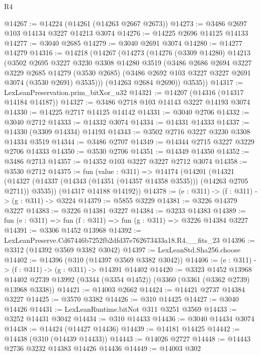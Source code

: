 \begin{lexlean}{R4}
\begin{coremodule}
@14267 := @14224 (@14261 (@14263 @2667 @2673))
@14273 := @3486 @2697 @103 @14134 @3227 @14213 @3074
@14276 := @14225 @2696 @14125 @14133
@14277 := @3040 @2685
@14279 := @3040 @2691 @3074
@14280 := @14277 @14279
@14316 := @14218
    (@14267
      (@14273
        (@14276
          (@3309 @14280)
          @14213
          (@3502
            @2695
            @3227
            @3230
            @3308
            @14280
            @3519
            (@3486
              @2686
              @2694
              @3227
              @3229
              @2685
              @14279
              (@3530 @2685)
              (@3486 @2692 @103 @3227 @3227 @2691 @3074 (@3530 @2691) @3535)))
          (@14263 @2684 @2690))
        @3535))
@14317 := LexLeanPreservation.prim_bitXor_u32
@14321 := @14207 (@14316 (@14317 @14184 @14187))
@14327 := @3486 @2718 @103 @14143 @3227 @14193 @3074
@14330 := @14225 @2717 @14125 @14142
@14331 := @3040 @2706
@14332 := @3040 @2712
@14333 := @14332 @3074
@14334 := @14331 @14333
@14337 := @14330 (@3309 @14334) @14193
@14343 := @3502 @2716 @3227 @3230 @3308 @14334 @3519
@14344 := @3486 @2707
@14349 := @14344 @2715 @3227 @3229 @2706 @14333
@14350 := @3530 @2706
@14351 := @14349 @14350
@14352 := @3486 @2713
@14357 := @14352 @103 @3227 @3227 @2712 @3074
@14358 := @3530 @2712
@14375 := fun (value : @311) =>
  @14174
    (@14201
      (@14321 (@14327 (@14337 (@14343 (@14351 (@14357 @14358 @3535))) (@14263 @2705 @2711)) @3535))
      (@14317 @14188 @14192))
@14378 := (e : @311) -> (f : @311) -> (g : @311) -> @3224
@14379 := @5855 @3229
@14381 := @3226 @14379 @3227
@14383 := @3226 @14381 @3227
@14384 := @3233 @14383
@14389 := fun (e : @311) => fun (f : @311) => fun (g : @311) => @3226 @14384 @3227
@14391 := @3306 @1452 @13968
@14392 := LexLeanPreserve.Cd67446b7252fb2dfd37e762673433a18.R4.__fits_23
@14396 := @3312 (@14392 @3569 @3382 @3042)
@14397 := LexLeanStd.Sha256.choose
@14402 := @14396 (@310 (@14397 @3569 @3382 @3042))
@14406 := (e : @311) -> (f : @311) -> (g : @311) -> @14391 @14402
@14420 := @3323
    @1452
    @13968
    @14402
    @2739
    @13992
    (@3344 (@3354 @1452))
    (@3360 (@3361 (@3362 @2739) @13968 @3338))
@14421 := @14003 @2662
@14424 := @14421 @2737 @14384 @3227
@14425 := @3570 @3382
@14426 := @310 @14425
@14427 := @3040 @14426
@14431 := LexLeanRuntime.bitNot @311 @3251 @3569
@14433 := @3252 @14431 @3042
@14434 := @310 @14433
@14436 := @3040 @14434 @3074
@14438 := @14424 (@14427 @14436)
@14439 := @14181 @14425
@14442 := @14438 (@310 (@14439 @14433))
@14443 := @14026 @2727
@14448 := @14443 @2736 @3232 @14383 @14426 @14436
@14449 := @14003 @302

\end{coremodule}
\end{lexlean}
